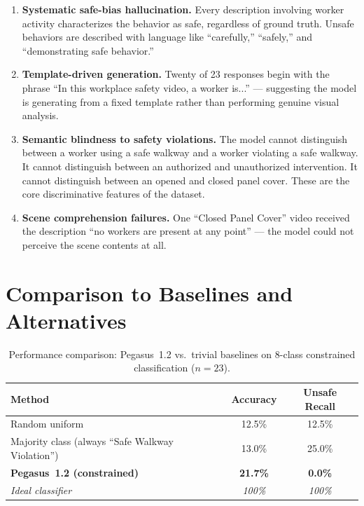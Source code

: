 \documentclass[11pt,a4paper]{article}
\begin{document}
\begin{enumerate}
    \item \textbf{Systematic safe-bias hallucination.} Every description involving worker activity characterizes the behavior as safe, regardless of ground truth. Unsafe behaviors are described with language like ``carefully,'' ``safely,'' and ``demonstrating safe behavior.''

    \item \textbf{Template-driven generation.} Twenty of 23 responses begin with the phrase ``In this workplace safety video, a worker is...'' --- suggesting the model is generating from a fixed template rather than performing genuine visual analysis.

    \item \textbf{Semantic blindness to safety violations.} The model cannot distinguish between a worker using a safe walkway and a worker violating a safe walkway. It cannot distinguish between an authorized and unauthorized intervention. It cannot distinguish between an opened and closed panel cover. These are the core discriminative features of the dataset.

    \item \textbf{Scene comprehension failures.} One ``Closed Panel Cover'' video received the description ``no workers are present at any point'' --- the model could not perceive the scene contents at all.
\end{enumerate}

\section{Comparison to Baselines and Alternatives}

\begin{table}[H]
\centering
\caption{Performance comparison: Pegasus~1.2 vs.\ trivial baselines on 8-class constrained classification ($n{=}23$).}
\label{tab:baselines}
\begin{tabular}{@{}lcc@{}}
\toprule
\textbf{Method} & \textbf{Accuracy} & \textbf{Unsafe Recall} \\
\midrule
Random uniform & 12.5\% & 12.5\% \\
Majority class (always ``Safe Walkway Violation'') & 13.0\% & 25.0\% \\
\textbf{Pegasus~1.2 (constrained)} & \textbf{21.7\%} & \textbf{0.0\%} \\
\midrule
\textit{Ideal classifier} & \textit{100\%} & \textit{100\%} \\
\bottomrule
\end{tabular}
\end{table}
\end{document}
